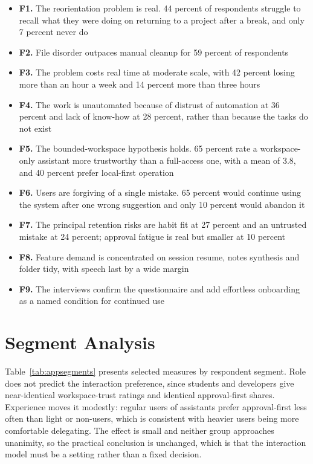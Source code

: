 \documentclass{FastFyp}
\begin{document}
\begin{itemize}
    \item \textbf{F1.} The reorientation problem is real. 44 percent of respondents struggle to recall what they were doing on returning to a project after a break, and only 7 percent never do
    \item \textbf{F2.} File disorder outpaces manual cleanup for 59 percent of respondents
    \item \textbf{F3.} The problem costs real time at moderate scale, with 42 percent losing more than an hour a week and 14 percent more than three hours
    \item \textbf{F4.} The work is unautomated because of distrust of automation at 36 percent and lack of know-how at 28 percent, rather than because the tasks do not exist
    \item \textbf{F5.} The bounded-workspace hypothesis holds. 65 percent rate a workspace-only assistant more trustworthy than a full-access one, with a mean of 3.8, and 40 percent prefer local-first operation
    \item \textbf{F6.} Users are forgiving of a single mistake. 65 percent would continue using the system after one wrong suggestion and only 10 percent would abandon it
    \item \textbf{F7.} The principal retention risks are habit fit at 27 percent and an untrusted mistake at 24 percent; approval fatigue is real but smaller at 10 percent
    \item \textbf{F8.} Feature demand is concentrated on session resume, notes synthesis and folder tidy, with speech last by a wide margin
    \item \textbf{F9.} The interviews confirm the questionnaire and add effortless onboarding as a named condition for continued use
\end{itemize}

\section{Segment Analysis}
Table~\ref{tab:appsegments} presents selected measures by respondent segment. Role does not predict the interaction preference, since students and developers give near-identical workspace-trust ratings and identical approval-first shares. Experience moves it modestly: regular users of assistants prefer approval-first less often than light or non-users, which is consistent with heavier users being more comfortable delegating. The effect is small and neither group approaches unanimity, so the practical conclusion is unchanged, which is that the interaction model must be a setting rather than a fixed decision.
\end{document}
